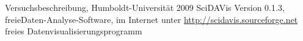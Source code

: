 \renewcommand{\refname}{Literatur und Programme}
\begin{thebibliography}{xxxxxx}
        Versuchsbeschreibung, Humboldt-Universität 2009
SciDAVis Version 0.1.3, freieDaten-Analyse-Software, im Internet unter
\href{http://scidavis.sourceforge.net}{http://scidavis.sourceforge.net}
 freies Datenvisualisierungsprogramm
\end{thebibliography}